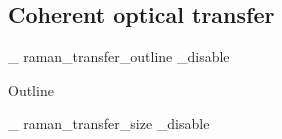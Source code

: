 \documentclass{beamer}
\newcommand\ifSlide[1]{
    \expandafter\ifcsname slide_ #1 _disable \endcsname
    \else
  }
\newcommand\ifSlide[1]{
    \expandafter\ifcsname slide_ #1 _enable \endcsname
  }
\begin{document}
\subsection{Coherent optical transfer}
\ifSlide{raman_transfer_outline}
\begin{frame}{Outline}
\end{frame}
\fi

\ifSlide{raman_transfer_size}
\end{document}
